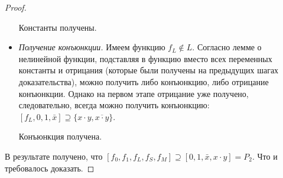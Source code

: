 \begin{proof}
\begin{itemize}
    Константы получены.
    \item \textit{Получение конъюнкции.} 
    Имеем функцию $f_L \notin L$. 
    Согласно лемме о нелинейной функции, подставляя в функцию вместо всех переменных константы и отрицания (которые были получены на предыдущих шагах доказательства), можно получить либо конъюнкцию, либо отрицание конъюнкции.
    Однако на первом этапе отрицание уже получено, следовательно, всегда можно получить конъюнкцию: $[f_L, 0, 1, \bar{x}] \supseteq \{x \cdot y, \overline{x \cdot y}\}$. 
    
    Конъюнкция получена.
\end{itemize}

В результате получено, что $[f_0, f_1, f_L, f_S, f_M] \supseteq [0, 1, \bar{x}, x \cdot y] = P_2$.
Что и требовалось доказать.
\end{proof}


